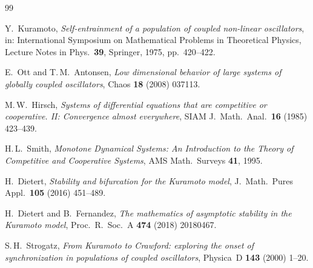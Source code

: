 \documentclass[11pt,a4paper]{article}
\theoremstyle{definition}
\begin{document}
\begin{thebibliography}{99}

Y.~Kuramoto, \emph{Self-entrainment of a population of coupled non-linear oscillators}, in: International Symposium on Mathematical Problems in Theoretical Physics, Lecture Notes in Phys.\ \textbf{39}, Springer, 1975, pp.~420--422.

E.~Ott and T.\,M.~Antonsen, \emph{Low dimensional behavior of large systems of globally coupled oscillators}, Chaos \textbf{18} (2008) 037113.

M.\,W.~Hirsch, \emph{Systems of differential equations that are competitive or cooperative. II: Convergence almost everywhere}, SIAM J.~Math.~Anal.\ \textbf{16} (1985) 423--439.

H.\,L.~Smith, \emph{Monotone Dynamical Systems: An Introduction to the Theory of Competitive and Cooperative Systems}, AMS Math.\ Surveys \textbf{41}, 1995.

H.~Dietert, \emph{Stability and bifurcation for the Kuramoto model}, J.~Math.~Pures Appl.\ \textbf{105} (2016) 451--489.

H.~Dietert and B.~Fernandez, \emph{The mathematics of asymptotic stability in the Kuramoto model}, Proc.~R.~Soc.~A \textbf{474} (2018) 20180467.

S.\,H.~Strogatz, \emph{From Kuramoto to Crawford: exploring the onset of synchronization in populations of coupled oscillators}, Physica~D \textbf{143} (2000) 1--20.

\end{thebibliography}
\end{document}
